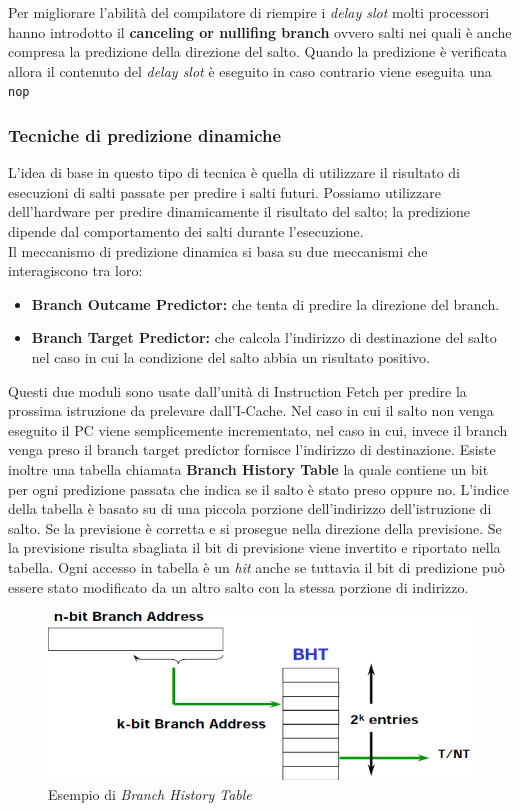 Per migliorare l'abilità del compilatore di riempire i \emph{delay slot} molti processori hanno introdotto il \textbf{canceling or nullifing branch} ovvero salti nei quali è anche compresa la predizione della direzione del salto. Quando la predizione è verificata allora il contenuto del \emph{delay slot} è eseguito in caso contrario viene eseguita una \texttt{nop}
\subsubsection{Tecniche di predizione dinamiche}
L'idea di base in questo tipo di tecnica è quella di utilizzare il risultato di esecuzioni di salti passate per predire i salti futuri. Possiamo utilizzare dell'hardware per predire dinamicamente il risultato del salto; la predizione dipende dal comportamento dei salti durante l'esecuzione.\\
Il meccanismo di predizione dinamica si basa su due meccanismi che interagiscono tra loro:
\begin{itemize}
\item \textbf{Branch Outcame Predictor:} che tenta di predire la direzione del branch.
\item \textbf{Branch Target Predictor:} che calcola l'indirizzo di destinazione del salto nel caso in cui la condizione del salto abbia un risultato positivo.
\end{itemize}
Questi due moduli sono usate dall'unità di Instruction Fetch per predire la prossima istruzione da prelevare dall'I-Cache. Nel caso in cui il salto non venga eseguito il PC viene semplicemente incrementato, nel caso in cui, invece il branch venga preso il branch target predictor fornisce l'indirizzo di destinazione. Esiste inoltre una tabella chiamata \textbf{Branch History Table}  la quale contiene un bit per ogni predizione passata che indica se il salto è stato preso oppure no. L'indice della tabella è basato su di una piccola porzione dell'indirizzo dell'istruzione di salto. Se la previsione è corretta e si prosegue nella direzione della previsione. Se la previsione risulta sbagliata il bit di previsione viene invertito e riportato nella tabella. Ogni accesso in tabella è un \emph{hit} anche se tuttavia il bit di predizione può essere stato modificato da un altro salto con la stessa porzione di indirizzo.
\begin{figure}[htb]
\centering
\includegraphics[scale=0.5]{img/historytable.png}
\caption{Esempio di \emph{Branch History Table}}\label{fig:historytable}
\end{figure}
